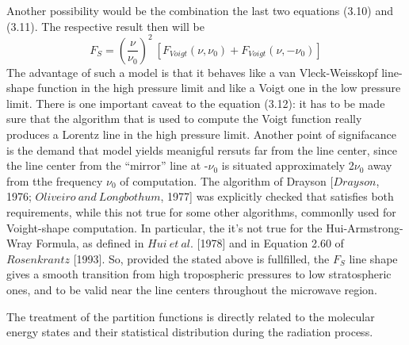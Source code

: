Another possibility would be the combination the last two equations
(3.10) and (3.11). The respective result then will be 
\begin{equation}
 F_S=\left(\frac{\nu}{\nu_0}\right)^2~[F_{Voigt}(\nu,\nu_0)+F_{Voigt}(\nu,-\nu_0)]
\label{}
\end{equation}
The advantage of such a model is that it behaves like a van
Vleck-Weisskopf line-shape function in the high pressure limit and
like a Voigt one in the low pressure limit. There is one important
caveat to the equation (3.12): it has to be made sure that the
algorithm that is used to compute the Voigt function really produces a
Lorentz line in the high pressure limit. Another point of signifacance
is the demand that model yields meanigful rersuts far from the line
center, since the line center from the ``mirror'' line at -$\nu_0$ is
situated approximately 2$\nu_0$ away from tthe frequency $\nu_0$ of
computation. The algorithm of Drayson [$Drayson$, 1976; $Oliveiro~and~
Longbothum$, 1977] was explicitly checked that satisfies both
requirements, while this not true for some other algorithms, commonlly
used for Voight-shape computation. In particular, the it's not true
for the Hui-Armstrong-Wray Formula, as defined in $Hui~et~al.$
[1978] and in Equation 2.60 of $Rosenkrantz$ [1993]. So, provided the
stated above is fullfilled, the $F_S$ line shape gives a smooth
transition from high tropospheric pressures to low stratospheric ones,
and to be valid near the line centers throughout the microwave region.

The treatment of the partition functions is directly related to the molecular
energy states and their statistical distribution during the
radiation process. 

